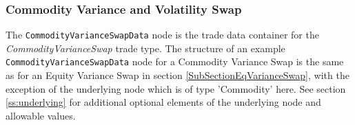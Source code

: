\subsubsection{Commodity Variance and Volatility Swap}
\label{SubSectionCommodityVarianceSwap}

The \lstinline!CommodityVarianceSwapData! node is the trade data container for the \emph{CommodityVarianceSwap} trade type. 
The structure of an example \lstinline!CommodityVarianceSwapData! node for a Commodity Variance Swap is the same as for an Equity Variance Swap in section
\ref{SubSectionEqVarianceSwap}, with the exception of the underlying node which is of type 'Commodity' here.
See section \ref{ss:underlying} for additional optional elements of the underlying node and allowable values.
